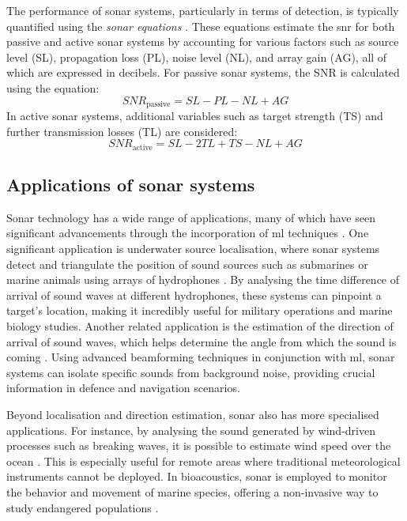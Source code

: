 The performance of sonar systems, particularly in terms of detection, is typically quantified using the \textit{sonar equations} \cite{abraham_underwater_2019, waite_sonar_2002}. These equations estimate the \acrfull{snr} for both passive and active sonar systems by accounting for various factors such as source level (SL), propagation loss (PL), noise level (NL), and array gain (AG), all of which are expressed in decibels. For passive sonar systems, the SNR is calculated using the equation:
\begin{equation}
    SNR_\text{passive} = SL - PL - NL + AG
\end{equation}
In active sonar systems, additional variables such as target strength (TS) and further transmission losses (TL) are considered:
\begin{equation}
    SNR_\text{active} = SL - 2TL + TS - NL + AG
\end{equation}

\subsection{Applications of sonar systems}
Sonar technology has a wide range of applications, many of which have seen significant advancements through the incorporation of \acrlong{ml} techniques \cite{bianco_machine_2019}. One significant application is underwater source localisation, where sonar systems detect and triangulate the position of sound sources such as submarines or marine animals using arrays of hydrophones \cite{su_review_2020, wang_underwater_2018, zhang_underwater_2018}. By analysing the time difference of arrival of sound waves at different hydrophones, these systems can pinpoint a target's location, making it incredibly useful for military operations and marine biology studies. Another related application is the estimation of the direction of arrival of sound waves, which helps determine the angle from which the sound is coming \cite{ozanich_feedforward_2020, liu_doa_2021, li_deep_2022, cao_deep_2016}. Using advanced beamforming techniques in conjunction with \acrlong{ml}, sonar systems can isolate specific sounds from background noise, providing crucial information in defence and navigation scenarios. 

Beyond localisation and direction estimation, sonar also has more specialised applications. For instance, by analysing the sound generated by wind-driven processes such as breaking waves, it is possible to estimate wind speed over the ocean \cite{cauchy_wind_2018}. This is especially useful for remote areas where traditional meteorological instruments cannot be deployed. In bioacoustics, sonar is employed to monitor the behavior and movement of marine species, offering a non-invasive way to study endangered populations \cite{cato_ultrasonic_1992, richardson_marine_1995, patek_evolutionary_2018, lohse_snapping_2001, ritzmann_snapping_1973}. 


